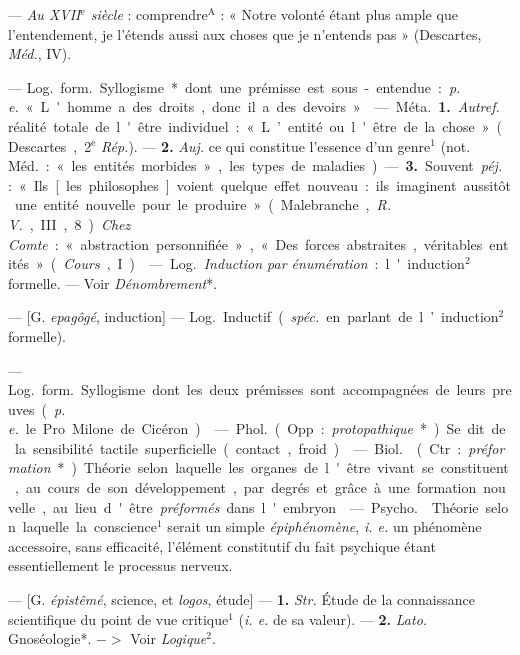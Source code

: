 \begin{itemize}[leftmargin=1cm, label=, itemsep=1pt]
 — {\it Au XVII$^\text{e}$ siècle} : comprendre$^\text{A}$ :
« Notre volonté étant plus ample que l’entendement, je l’étends
aussi aux choses que je n'entends pas » (Descartes, {\it Méd.}, IV).

 — \si{Log.} \si{form.} Syllogisme* dont une prémisse est
sous-entendue : {\it p. e.} « L'homme a des droits, donc il a des devoirs ».

 — \si{Méta.} {\bf 1.} {\it Autref.} réalité
totale de l'être individuel : « L’entité ou l'être de la chose » (Descartes, 2$^\text{e}$ {\it Rép.}). — {\bf 2.} {\it Auj.} ce qui
constitue l’essence d’un genre$^1$ (not.
\si{Méd.} : « les entités morbides », les
types de maladies). — {\bf 3.} Souvent
 {\it péj.} : « Ils [les philosophes] voient
quelque effet nouveau : ils imaginent aussitôt une entité nouvelle
pour le produire » (Malebranche, {\it R. V.}, III, 8). {\it Chez Comte} :
« abstraction personnifiée », « Des forces abstraites, véritables entités »
({\it Cours}, I).

 — \si{Log.} {\it Induction par énumération} :
l'induction$^2$ formelle. — Voir {\it Dénombrement}*.

 — [G. {\it epagôgé}, induction]
— \si{Log.} Inductif ({\it spéc.} en parlant
de l’induction$^2$ formelle).

 — \si{Log.} \si{form.} Syllogisme dont les deux
prémisses sont accompagnées de leurs
preuves ({\it p. e.} le Pro Milone de Cicéron).

 — \si{Phol.} (Opp. : {\it protopathique}*). Se dit
de la sensibilité tactile superficielle (contact, froid).

 — \si{Biol.}  (Ctr.: {\it préformation}*).
Théorie selon laquelle les organes de l'être vivant se constituent,
au cours de son développement, par degrés et grâce à une
formation nouvelle, au lieu d'être
{\it préformés} dans l'embryon.

 — \si{Psycho.} 
Théorie selon laquelle la conscience$^1$
serait un simple {\it épiphénomène}, {\it i. e.}
un phénomène accessoire, sans efficacité, l’élément constitutif du fait
psychique étant essentiellement le processus nerveux.

 — [G. {\it épistêmé}, science,
et {\it logos}, étude] — {\bf 1.} {\it Str.} Étude de
la connaissance scientifique du point
de vue critique$^1$ ({\it i. e.} de sa valeur).
— {\bf 2.} {\it Lato.} Gnoséologie*. $->$ Voir
{\it Logique}$^2$.


\end{itemize}
